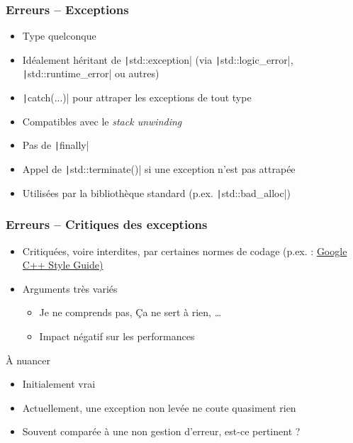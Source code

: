 \documentclass[C++.tex]{subfiles}
\begin{document}
\begin{frame}[fragile]
	\frametitle{Erreurs -- Exceptions}
	\begin{itemize}
		\item Type quelconque
		\item Idéalement héritant de \texttt|std::exception| (via \texttt|std::logic_error|, \texttt|std::runtime_error| ou autres)
		\item \texttt|catch(...)| pour attraper les exceptions de tout type
		\item Compatibles avec le \textit{stack unwinding}


		\item Pas de \texttt|finally|
		\item Appel de \texttt|std::terminate()| si une exception n'est pas attrapée


		\item Utilisées par la bibliothèque standard (p.ex. \texttt|std::bad_alloc|)
	\end{itemize}
\end{frame}

\begin{frame}[fragile]
	\frametitle{Erreurs -- Critiques des exceptions}
	\begin{itemize}
		\item Critiquées, voire interdites, par certaines normes de codage (p.ex. : \href{https://google.github.io/styleguide/cppguide.html}{Google C++ Style Guide)}
		\item Arguments très variés
		\begin{itemize}
			\item \og Je ne comprends pas\fg{}, \og Ça ne sert à rien\fg{}, \ldots{}
			\item Impact négatif sur les performances
		\end{itemize}
	\end{itemize}

	\begin{block}{À nuancer}
		\begin{itemize}
			\item Initialement vrai
			\item Actuellement, une exception non levée ne coute quasiment rien
			\item Souvent comparée à une non gestion d'erreur, est-ce pertinent ? 
		\end{itemize}
	\end{block}
\end{frame}
\end{document}
